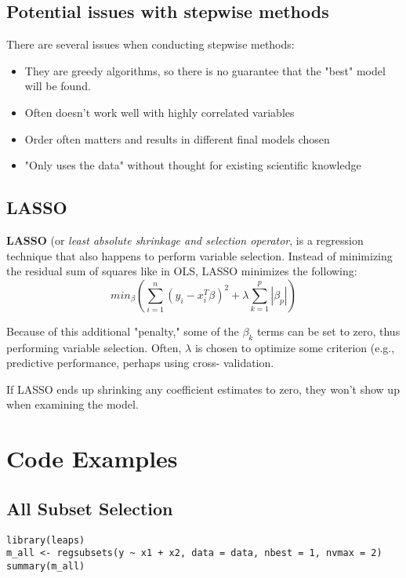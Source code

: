 \documentclass[titlepage, 12pt, leqno]{article}
\begin{document}
\subsection{Potential issues with stepwise methods}
There are several issues when conducting stepwise methods:
\begin{itemize}
    \item They are greedy algorithms, so there is no guarantee that the "best"
        model will be found.
    \item Often doesn't work well with highly correlated variables
    \item Order often matters and results in different final models chosen
    \item "Only uses the data" without thought for existing scientific knowledge
\end{itemize}

\subsection{LASSO}
\begin{definition}
    \textbf{LASSO} (or \textit{least absolute shrinkage and selection operator},
    is a regression technique that also happens to perform variable selection.
    Instead of minimizing the residual sum of squares like in OLS, LASSO
    minimizes the following:
    \[
        min_{\beta}\left(\sum_{i=1}^{n}(y_i-x_i^T\beta)^2 + \lambda\sum_{k=1}^{p}|
        \beta_p|\right)
    \]
\end{definition}

Because of this additional "penalty," some of the $\beta_k$ terms can be set
to zero, thus performing variable selection. Often, $\lambda$ is chosen to
optimize some criterion (e.g., predictive performance, perhaps using cross-
validation.

\begin{note}
    If LASSO ends up shrinking any coefficient estimates to zero, they won't show
    up when examining the model.
\end{note}

\pagebreak
\section{Code Examples}
\subsection{All Subset Selection}
\begin{verbatim}
library(leaps)
m_all <- regsubsets(y ~ x1 + x2, data = data, nbest = 1, nvmax = 2)
summary(m_all)
\end{verbatim}
\end{document}
